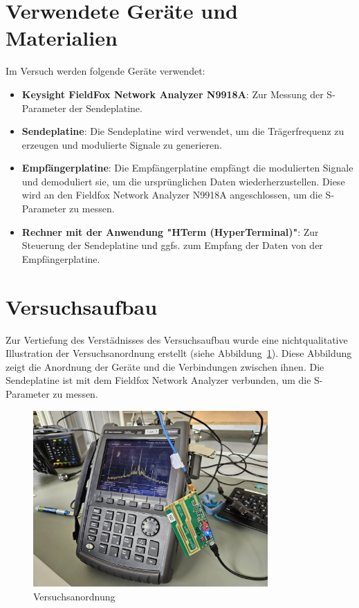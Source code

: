 \section{Verwendete Geräte und Materialien}
Im Versuch werden folgende Geräte verwendet:
\begin{itemize}
    \item \textbf{Keysight FieldFox Network Analyzer N9918A}: Zur Messung der S-Parameter der Sendeplatine.
    \item \textbf{Sendeplatine}: Die Sendeplatine wird verwendet, um die Trägerfrequenz zu erzeugen und modulierte Signale zu generieren.
    \item \textbf{Empfängerplatine}: Die Empfängerplatine empfängt die modulierten Signale und demoduliert sie, um die ursprünglichen Daten wiederherzustellen. Diese wird an den Fieldfox Network Analyzer N9918A angeschlossen, um die S-Parameter zu messen.
    \item \textbf{Rechner mit der Anwendung "HTerm (HyperTerminal)"}: Zur Steuerung der Sendeplatine und ggfs. zum Empfang der Daten von der Empfängerplatine. 
\end{itemize}
\clearpage
\section{Versuchsaufbau}
Zur Vertiefung des Verstädnisses des Versuchsaufbau wurde eine nichtqualitative Illustration der Versuchsanordnung erstellt (siehe Abbildung~\ref{fig:Versuchsanordnung}). Diese Abbildung zeigt die Anordnung der Geräte und die Verbindungen zwischen ihnen. Die Sendeplatine ist mit dem Fieldfox Network Analyzer verbunden, um die S-Parameter zu messen.
\begin{figure}[H]
    \centering
    \includegraphics[width=0.8\textwidth]{Pictures/Versuchsanordnung.jpg}
    \caption{Versuchsanordnung}
    \label{fig:Versuchsanordnung}
\end{figure}
\clearpage